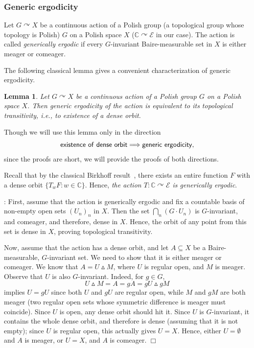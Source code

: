 \documentclass[11pt]{paper}
\newtheorem{lemma}{Lemma}
\newcommand{\bC}{\mathbb C}
\newcommand{\cE}{\mathcal E}
\begin{document}
\subsubsection{Generic ergodicity}
Let $G\curvearrowright X$ be a continuous action of a Polish group (a topological group whose topology
is Polish) $G$ on a Polish space $X$ ($\bC\curvearrowright \cE$ in our case). The action is called
{\em generically ergodic} if every $G$-invariant Baire-measurable set in $X$ is either meager or comeager.

The following classical lemma gives a convenient characterization of generic ergodicity.
\begin{lemma}\label{lemma:generic_ergod}
  Let $G\curvearrowright X$ be a continuous action of a Polish group $G$ on a Polish space $X$. Then
  generic ergodicity of the action is equivalent to its topological transitivity, i.e., to existence
  of a dense orbit.
\end{lemma}
Though we will use this lemma only in the direction
\[
{\sf existence\ of\ dense\ orbit} \Longrightarrow {\sf generic\ ergodicity},
\]
since the proofs are short, we will provide the proofs of both directions.

Recall that by the classical Birkhoff result~\cite{Birkhoff}, there exists an entire function $F$ with
a dense orbit $\{T_w F\colon w\in\bC\}$. Hence, {\em the action $T\colon \bC\curvearrowright \cE$ is generically ergodic}.

\medskip{}:
First, assume that the action is generically ergodic and fix a countable basis of non-empty open sets
$(U_n)_n$ in $X$. Then the set $\bigcap_n (G\cdot U_n)$ is $G$-invariant, and comeager, and therefore,
dense in $X$. Hence, the orbit of any point from this set is dense in $X$, proving topological transitivity.

\smallskip Now, assume that the action has a dense orbit, and let $A\subseteq X$ be a Baire-measurable,
$G$-invariant set. We need to show that it is either meager or comeager. We know that
$A=U\vartriangle M$, where $U$ is regular open, and $M$ is meager.
Observe that $U$ is also $G$-invariant. Indeed, for $g\in G$,
\[
U \vartriangle M  = A = gA = gU \vartriangle gM
\]
implies $U=gU$ since both $U$ and $gU$ are regular open, while $M$ and $gM$ are
both meager (two regular open sets whose symmetric difference is meager must coincide).
Since $U$ is open, any dense orbit should hit it. Since $U$ is $G$-invariant,
it contains the whole dense orbit, and therefore is dense (assuming that it is not empty);
since $U$ is regular open, this actually gives $U=X$.
Hence, either $U=\emptyset$ and $A$ is meager, or $U=X$, and $A$ is comeager.
\hfill $\Box$
\end{document}
